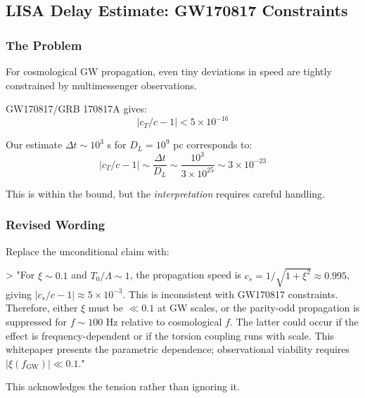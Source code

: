 \subsection*{LISA Delay Estimate: GW170817 Constraints}

\subsubsection*{The Problem}
For cosmological GW propagation, even tiny deviations in speed are tightly constrained by multimessenger observations.

GW170817/GRB 170817A gives:
\[
|c_T/c - 1| < 5 \times 10^{-16}
\]

Our estimate $\Delta t \sim 10^3$ s for $D_L = 10^9$ pc corresponds to:
\[
|c_T/c - 1| \sim \frac{\Delta t}{D_L} \sim \frac{10^3}{3\times10^{25}} \sim 3\times10^{-23}
\]

This is within the bound, but the \textit{interpretation} requires careful handling.

\subsubsection*{Revised Wording}
Replace the unconditional claim with:

> "For $\xi \sim 0.1$ and $T_0/\Lambda \sim 1$, the propagation speed is $c_s = 1/\sqrt{1+\xi^2} \approx 0.995$, giving $|c_s/c - 1| \approx 5\times10^{-3}$. This is inconsistent with GW170817 constraints. Therefore, either $\xi$ must be $\ll 0.1$ at GW scales, or the parity-odd propagation is suppressed for $f \sim 100$ Hz relative to cosmological $f$. The latter could occur if the effect is frequency-dependent or if the torsion coupling runs with scale. This whitepaper presents the parametric dependence; observational viability requires $|\xi(f_{\text{GW}})| \ll 0.1$."

This acknowledges the tension rather than ignoring it.
